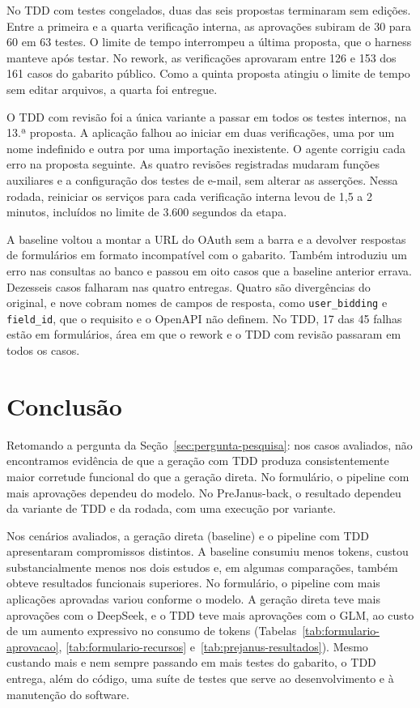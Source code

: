 \documentclass[a4paper,12pt,twoside,english,brazilian]{book}
\begin{document}
No TDD com testes congelados, duas das seis propostas terminaram sem
edições. Entre a primeira e a quarta verificação interna, as aprovações
subiram de 30 para 60 em 63 testes. O limite de tempo interrompeu a última
proposta, que o harness manteve após testar. No rework, as verificações
aprovaram entre 126 e 153 dos 161 casos do gabarito público. Como a quinta
proposta atingiu o limite de tempo sem editar arquivos, a quarta foi
entregue.

O TDD com revisão foi a única variante a passar em todos os testes internos,
na 13.ª proposta. A aplicação falhou ao iniciar em duas verificações, uma
por um nome indefinido e outra por uma importação inexistente. O agente
corrigiu cada erro na proposta seguinte. As quatro revisões registradas
mudaram funções auxiliares e a configuração dos testes de e-mail, sem
alterar as asserções. Nessa rodada, reiniciar os serviços para cada
verificação interna levou de 1,5 a 2 minutos, incluídos no limite de 3.600
segundos da etapa.

A baseline voltou a montar a URL do OAuth sem a barra e a devolver
respostas de formulários em formato incompatível com o gabarito. Também
introduziu um erro nas consultas ao banco e passou em oito casos que a
baseline anterior errava. Dezesseis casos falharam nas quatro entregas.
Quatro são divergências do original, e nove cobram nomes de campos de
resposta, como \texttt{user\_bidding} e \texttt{field\_id}, que o requisito
e o OpenAPI não definem. No TDD, 17 das 45 falhas estão em formulários,
área em que o rework e o TDD com revisão passaram em todos os casos.

\chapter{Conclusão}
\label{cap:conclusao}

Retomando a pergunta da Seção~\ref{sec:pergunta-pesquisa}: nos casos
avaliados, não encontramos evidência de que a geração com TDD produza
consistentemente maior corretude funcional do que a geração direta. No
formulário, o pipeline com mais aprovações dependeu do modelo. No
PreJanus-back, o resultado dependeu da variante de TDD e da rodada, com uma
execução por variante.

Nos cenários avaliados, a geração direta (baseline) e o pipeline com TDD
apresentaram compromissos distintos. A baseline consumiu menos tokens,
custou substancialmente menos nos dois estudos e, em algumas comparações,
também obteve resultados funcionais superiores. No formulário, o pipeline
com mais aplicações aprovadas variou conforme o modelo. A geração direta
teve mais aprovações com o DeepSeek, e o TDD teve mais aprovações com o GLM,
ao custo de um aumento expressivo no consumo de tokens
(Tabelas~\ref{tab:formulario-aprovacao}, \ref{tab:formulario-recursos}
e~\ref{tab:prejanus-resultados}). Mesmo custando mais e nem sempre
passando em mais testes do gabarito, o TDD entrega, além do código, uma
suíte de testes que serve ao desenvolvimento e à manutenção do software.
\end{document}
